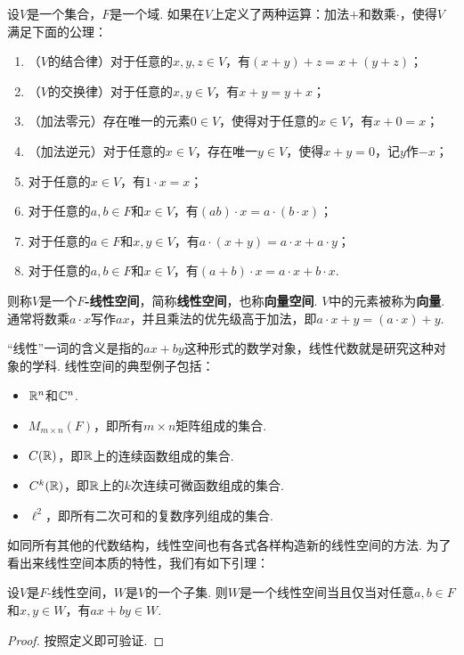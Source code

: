 \begin{definition}
设$V$是一个集合，$F$是一个域. 如果在$V$上定义了两种运算：加法$+$和数乘$\cdot$，使得$V$满足下面的公理：
\begin{enumerate}
    \item （$V$的结合律）对于任意的$x,y,z\in V$，有$(x+y)+z=x+(y+z)$；
    \item （$V$的交换律）对于任意的$x,y\in V$，有$x+y=y+x$；
    \item （加法零元）存在唯一的元素$0\in V$，使得对于任意的$x\in V$，有$x+0=x$；
    \item （加法逆元）对于任意的$x\in V$，存在唯一$y\in V$，使得$x+y=0$，记$y$作$-x$；
    \item 对于任意的$x\in V$，有$1\cdot x=x$；
    \item 对于任意的$a,b\in F$和$x\in V$，有$(ab)\cdot x=a\cdot (b\cdot x)$；
    \item 对于任意的$a\in F$和$x,y\in V$，有$a\cdot(x+y)=a\cdot x+a\cdot y$；
    \item 对于任意的$a,b\in F$和$x\in V$，有$(a+b)\cdot x=a\cdot x+b\cdot x$. 
\end{enumerate}
则称$V$是一个\textbf{$F$-线性空间}，简称\textbf{线性空间}，也称\textbf{向量空间}. $V$中的元素被称为\textbf{向量}. 通常将数乘$a\cdot x$写作$ax$，并且乘法的优先级高于加法，即$a\cdot x+y=(a\cdot x)+y$. 
\end{definition}

“线性”一词的含义是指的$ax+by$这种形式的数学对象，线性代数就是研究这种对象的学科. 线性空间的典型例子包括：
\begin{itemize}
    \item $\mathbb{R}^n$和$\mathbb{C}^n$.
    \item $M_{m\times n}(F)$，即所有$m\times n$矩阵组成的集合.
    \item $C(\mathbb{R})$，即$\mathbb{R}$上的连续函数组成的集合.
    \item $C^k(\mathbb{R})$，即$\mathbb{R}$上的$k$次连续可微函数组成的集合.
    \item $\ell^2$，即所有二次可和的复数序列组成的集合.
\end{itemize}

如同所有其他的代数结构，线性空间也有各式各样构造新的线性空间的方法. 为了看出来线性空间本质的特性，我们有如下引理：

\begin{lemma}\label{lemma:linear-space-subspace}
设$V$是$F$-线性空间，$W$是$V$的一个子集. 则$W$是一个线性空间当且仅当对任意$a,b\in F$和$x,y\in W$，有$ax+by\in W$. 
\end{lemma}
\begin{proof}
    按照定义即可验证. 
\end{proof}


